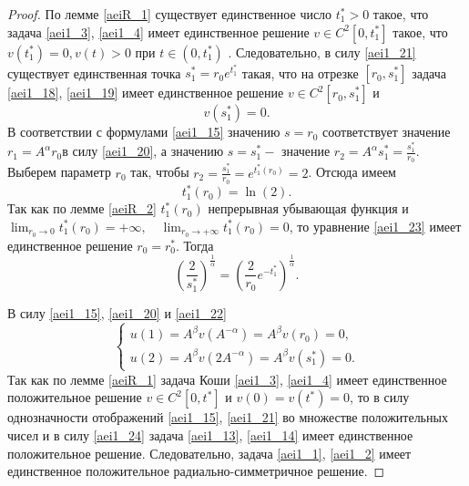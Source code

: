 \begin{proof}
 По лемме \ref{aeiR_1} существует единственное число $ t_1^*>0 $  такое, что задача \eqref{aei1_3},
\eqref{aei1_4} имеет единственное
 решение $ v \in C^2[0,t_1^*] $   такое, что $ v(t_1^*)=0,v(t)>0 $  при $ t \in (0,t_1^*)$ .
 Следовательно, в силу \eqref{aei1_21} существует единственная точка $ s_1^*=r_0e^{t_1^*}$
  такая, что на отрезке $ [r_0,s_1^*] $  задача \eqref{aei1_18},
\eqref{aei1_19} имеет единственное решение $ v \in C^2[r_0,s_1^*] $  и
\begin{equation}\label{aei1_22}
v(s_1^*)=0.
\end{equation}
В соответствии с формулами \eqref{aei1_15} значению $ s=r_0 $  соответствует
значение $ r_1=A^{\alpha }r_0 $в силу \eqref{aei1_20}, а значению $ s=s_1^*-$
значение $ r_2=A^{\alpha}s_1^*=\frac{s_1^*}{r_0}$. 
Выберем параметр
$ r_0 $ так, чтобы $ r_2=\frac{s_1^*}{r_0}=e^{t_1^*(r_0)}=2 $. 
Отсюда имеем
\begin{equation}\label{aei1_23}
t_1^*(r_0)=\ln(2).
\end{equation}
Так как по лемме \ref{aeiR_2} $ t_1^*(r_0)$  непрерывная убывающая функция и $
\displaystyle \lim_{r_0 \to 0}t_1^*(r_0)=+\infty, \quad
\displaystyle \lim_{r_0 \to +\infty}t_1^*(r_0)=0 $,  то уравнение
\eqref{aei1_23} имеет единственное решение $ r_0=r_0^*$. Тогда
$$
\left (\frac{2}{s_1^*}\right )^{\frac{1}{\alpha}}=\left
(\frac{2}{r_0}e^{-t_1^*}\right )^{\frac{1}{\alpha}}.
$$

В силу \eqref{aei1_15}, \eqref{aei1_20}  и \eqref{aei1_22}
\begin{equation}\label{aei1_24}
\begin{cases}
 u(1)=A^{\beta}v(A^{-\alpha})= A^{\beta}v(r_0)=0,\\
 u(2) =A^{\beta}v(2A^{-\alpha})=A^{\beta}v(s_1^*)=0.
\end{cases}      
\end{equation}
Так как по лемме \ref{aeiR_1} задача Коши  \eqref{aei1_3}, \eqref{aei1_4} имеет единственное
положительное решение $ v \in C^2[0,t^*] $  и $ v(0)=v(t^*)=0 $, то
в силу однозначности отображений \eqref{aei1_15}, \eqref{aei1_21} во множестве
положительных чисел и в силу \eqref{aei1_24}  задача \eqref{aei1_13}, \eqref{aei1_14} имеет
единственное положительное решение. Следовательно, задача \eqref{aei1_1}, \eqref{aei1_2}
имеет единственное  положительное радиально-симметричное решение.
\end{proof}







